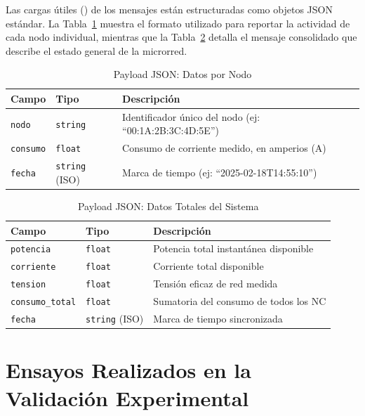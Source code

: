 Las cargas útiles () de los mensajes están estructuradas como objetos JSON estándar. La Tabla~\ref{tab:payload_nodo} muestra el formato utilizado para reportar la actividad de cada nodo individual, mientras que la Tabla~\ref{tab:payload_total} detalla el mensaje consolidado que describe el estado general de la microrred.

\begin{table}[ht!]
\centering
\caption{Payload JSON: Datos por Nodo}
\label{tab:payload_nodo}
\begin{tabular}{|l|l|l|}
\hline
\textbf{Campo} & \textbf{Tipo} & \textbf{Descripción} \\ \hline
\texttt{nodo} & \texttt{string} & Identificador único del nodo (ej: ``00:1A:2B:3C:4D:5E'') \\ \hline
\texttt{consumo} & \texttt{float} & Consumo de corriente medido, en amperios (A) \\ \hline
\texttt{fecha} & \texttt{string} (ISO) & Marca de tiempo (ej: ``2025-02-18T14:55:10'') \\ \hline
\end{tabular}
\end{table}

\begin{table}[ht!]
\centering
\caption{Payload JSON: Datos Totales del Sistema}
\label{tab:payload_total}
\begin{tabular}{|l|l|l|}
\hline
\textbf{Campo} & \textbf{Tipo} & \textbf{Descripción} \\ \hline
\texttt{potencia} & \texttt{float} & Potencia total instantánea disponible \\ \hline
\texttt{corriente} & \texttt{float} & Corriente total disponible \\ \hline
\texttt{tension} & \texttt{float} & Tensión eficaz de red medida \\ \hline
\texttt{consumo\_total} & \texttt{float} & Sumatoria del consumo de todos los NC \\ \hline
\texttt{fecha} & \texttt{string} (ISO) & Marca de tiempo sincronizada \\ \hline
\end{tabular}
\end{table}

\section{Ensayos Realizados en la Validación Experimental}

